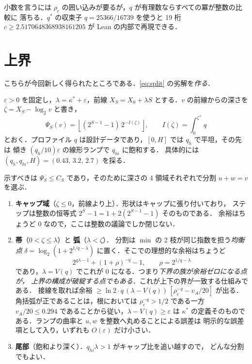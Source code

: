 \documentclass[a4paper,11pt]{jsarticle}
\begin{document}
小数を言うには $\rho_c$ の囲い込みが要るが，$q$ が有理数ならすべての冪が整数の比較に
落ちる．$q^*$ の収束子 $q = 25366/16739$ を使うと 19 桁
$c \ge 2.5170648368938161205$ が Lean の内部で再現できる．

\section{上界}
こちらが今回新しく得られたところである．\eqref{eq:split} の劣解を\emph{作る}．

$\varepsilon > 0$ を固定し，$\lambda = \kappa^* + \varepsilon$，前線
$X_S = X_0 + \lambda S$ とする．$v$ の前線からの深さを $\zeta = X_S - \log_2 v$ と書き，
\[
\Psi_S(v) = \left\lfloor (2^{S-1}{-}1)\, 2^{-I(\zeta)} \right\rfloor, \qquad
I(\zeta) = \int_0^{\zeta^+} q
\]
とおく．プロファイル $q$ は設計データであり，$[0,H]$ では $q_h$ で平坦，その先は
傾き $(q_h/10)\varepsilon$ の線形ランプで $q_{hi}$ に飽和する．
具体的には $(q_h, q_{hi}, H) = (0.43,\, 3.2,\, 2.7)$ を採る．

示すべきは $\Psi_S \le C_S$ であり，そのために深さの 4 領域それぞれで分割
$u + w = v$ を選ぶ．

\begin{enumerate}
\setlength{\itemsep}{1pt}
\item \textbf{キャップ域}（$\zeta \le 0$，前線より上）．形状はキャップに張り付いており，
ステップは整数の恒等式 $2^S{-}1 = 1 + 2(2^{S-1}{-}1)$ そのものである．
余裕はちょうど 0 なので，ここは整数の議論でしか閉じない．

\item \textbf{帯}（$0 < \zeta \le \lambda$）と \textbf{弧}（$\lambda < \zeta$）．
分割は $\min$ の 2 枝が同じ指数を担う\emph{均衡点}
$\delta = \log_2(1 + 2^{1/q-\lambda})$ に置く．そこでの理想的な余裕はちょうど
\[
2^{q\lambda-1} + (1{+}\rho)^{-q} - 1, \qquad \rho = 2^{1/q-\lambda}
\]
であり，$\lambda = V(q)$ でこれが 0 になる．つまり\emph{下界の族が余裕ゼロになる点が，
上界の構成が破綻する点でもある}．これが上下の界が一致する仕組みである．
接線を取れば余裕
$\ge \ln 2 \cdot q\,(\lambda - V(q))\,[\rho_c^{-q} - v_A/20]$ が出る．
角括弧が正であることは，根においては $\rho_c^{-q} > 1/2$ である一方
$v_A/20 \le 0.294$ であることから従い，$\lambda - V(q) \ge \varepsilon$ は
$\kappa^*$ の定義そのものである．ランプの曲率と $u, w$ を整数へ丸めることによる誤差は
明示的な誤差項として入り，いずれも $O(\varepsilon)$ だけ小さい．

\item \textbf{尾部}（飽和より深く）．$q_{hi}\lambda > 1$ がキャップ比を追い越すので，
どんな分割でもよい．
\end{enumerate}
\end{document}
